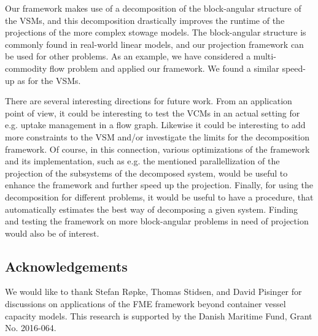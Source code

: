 \documentclass[citeauthoryear]{llncs}
\begin{document}
Our framework makes use of a decomposition of the block-angular structure of the VSMs, and this decomposition drastically improves the runtime of the projections of the more complex stowage models. The block-angular structure is commonly found in real-world linear models, and our projection framework can be used for other problems. As an example, we have considered a multi-commodity flow problem and applied our framework. We found a similar speed-up as for the VSMs. 

There are several interesting directions for future work. 
From an application point of view, it could be interesting to test the VCMs in an actual setting for e.g. uptake management in a flow graph.
Likewise it could be interesting to  add more constraints to the VSM and/or investigate the limits for the decomposition framework. Of course, in this connection, various optimizations of the framework and its implementation, such as e.g. the mentioned parallellization of the projection of the subsystems of the decomposed system, would be useful to enhance the framework and further speed up the projection. Finally, for using the decomposition for different problems, it would be useful to have a procedure, that automatically estimates the best way of decomposing a given system. Finding and testing the framework on more block-angular problems in need of projection would also be of interest.

\subsection*{Acknowledgements}
We would like to thank Stefan R{\o}pke, Thomas Stidsen, and David Pisinger for discussions on applications of the FME framework beyond container vessel capacity models. This research is supported by the Danish Maritime Fund, Grant No. 2016-064.

{}

\end{document}
